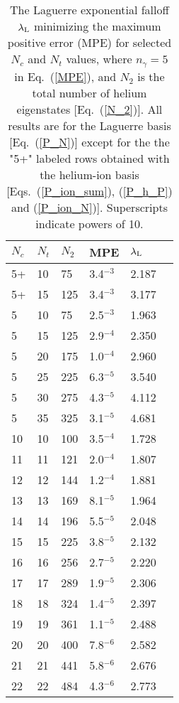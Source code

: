 \documentclass[aip
, pra
, showpacs
, aps
, twocolumn
, groupedaddress
, floatfix
]{revtex4}
\begin{document}
\begin{table}[htb]
\caption{\label{Tab_LAMBDAS}
The Laguerre exponential falloff $\lambda_{\rm L}$ minimizing the maximum positive error (MPE)
for selected $N_c$ and $N_t$ values, where $n_\gamma=5$ in Eq.~(\ref{MPE}), and $N_2$ is
the total number of helium eigenstates [Eq.~(\ref{N_2})].
All results are for the Laguerre basis [Eq.~(\ref{P_N})] except for the
the "5+" labeled rows obtained with the helium-ion basis
[Eqs.~(\ref{P_ion_sum}), (\ref{P_h_P}) and (\ref{P_ion_N})].
Superscripts indicate powers of 10.
}
\begin{ruledtabular}
\begin{tabular}{llllll}
$N_c$ & $N_t$ & $N_2$ & MPE & $\lambda_{\rm L}$ \\
\hline
5+  & 10  &  75   & 3.4$^{-3}$ &	2.187\\
5+  & 15  & 125   & 3.4$^{-3}$ &	3.177\\
\hline
5  & 10  &  75   & 2.5$^{-3}$ &	1.963 \\
5  & 15  & 125   & 2.9$^{-4}$ &	2.350 \\
5  & 20  & 175   & 1.0$^{-4}$ &	2.960 \\
5  & 25  & 225   & 6.3$^{-5}$ &	3.540 \\
5  & 30  & 275   & 4.3$^{-5}$ &	4.112 \\
5  & 35  & 325   & 3.1$^{-5}$ &	4.681 \\
\hline
10 & 10  & 100  & 3.5$^{-4}$ &	1.728 \\
11 & 11  & 121  & 2.0$^{-4}$ &	1.807 \\
12 & 12  & 144  & 1.2$^{-4}$ &	1.881 \\
13 & 13  & 169  & 8.1$^{-5}$ &	1.964 \\
14 & 14  & 196  & 5.5$^{-5}$ &	2.048 \\
15 & 15  & 225  & 3.8$^{-5}$ &	2.132 \\
16 & 16  & 256  & 2.7$^{-5}$ &	2.220 \\
17 & 17  & 289  & 1.9$^{-5}$ &	2.306 \\
18 & 18  & 324  & 1.4$^{-5}$ &	2.397 \\
19 & 19  & 361  & 1.1$^{-5}$ &	2.488 \\
20 & 20  & 400  & 7.8$^{-6}$ &	2.582 \\
21 & 21  & 441  & 5.8$^{-6}$ &	2.676 \\
22 & 22  & 484  & 4.3$^{-6}$ &	2.773 \\
\end{tabular}
\end{ruledtabular}
\end{table}
\end{document}
